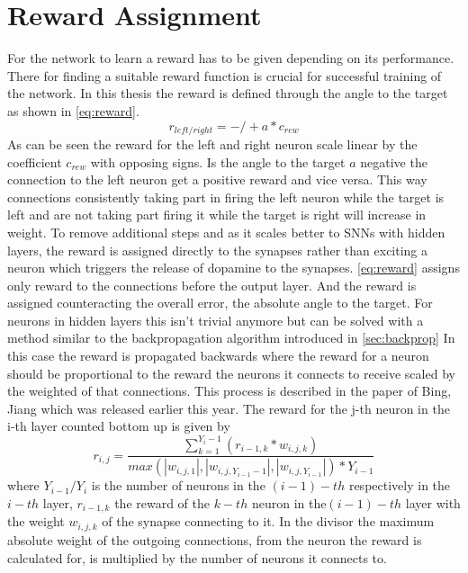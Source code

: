 \section{Reward Assignment}\label{sec:rewardAss}
For the network to learn a reward has to be given depending on its performance. There for finding a suitable reward function is crucial for successful training of the network.
In this thesis the reward is defined through the angle to the target as shown in \autoref{eq:reward}.
\begin{equation}\label{eq:reward}
r_{left/right} = -/+ a * c_{rew}
\end{equation}
As can be seen the reward for the left and right neuron scale linear by the coefficient $c_{rew}$ with opposing signs. Is the angle to the target $a$ negative the connection to the left neuron get a positive reward and vice versa. This way connections consistently taking part in firing the left neuron while the target is left and are not taking part firing it while the target is right will increase in weight.
To remove additional steps and as it scales better to SNNs with hidden layers, the reward is assigned directly to the synapses rather than exciting a neuron which triggers the release of dopamine to the synapses.
\autoref{eq:reward} assigns only reward to the connections before the output layer. And the reward is assigned counteracting the overall error, the absolute angle to the target. For neurons in hidden layers this isn’t trivial anymore but can be solved with a method similar to the backpropagation algorithm introduced in \autoref{sec:backprop}
In this case the reward is propagated backwards where the reward for a neuron should be proportional to the reward the neurons it connects to receive scaled by the weighted of that connections. This process is described in the paper of Bing, Jiang \cite{bing2019end} which was released earlier this year. The reward for the j-th neuron in the i-th layer counted bottom up is given by
\begin{equation}\label{eq:rewardProp}
r_{i,j} = 
\frac{ \sum_{k=1}^{Y_i-1}( r_{i-1,k} * w_{i,j,k}) }
	{ max( |w_{i,j,1}|, |w_{i,j,Y_{i-1}-1}|, |w_{i,j,Y_{i-1}}| ) * Y_{i-1}  } 
\end{equation}
where $Y_{i-1}/Y_{i}$ is the number of neurons in the $(i-1)-th$ respectively in the $i-th$ layer, $r_{i-1,k}$ the reward of the $k-th$ neuron in the$(i-1)-th$ layer with the weight $w_{i,j,k}$ of the synapse connecting to it. In the divisor the maximum absolute weight of the outgoing connections, from the neuron the reward is calculated for, is multiplied by the number of neurons it connects to.


